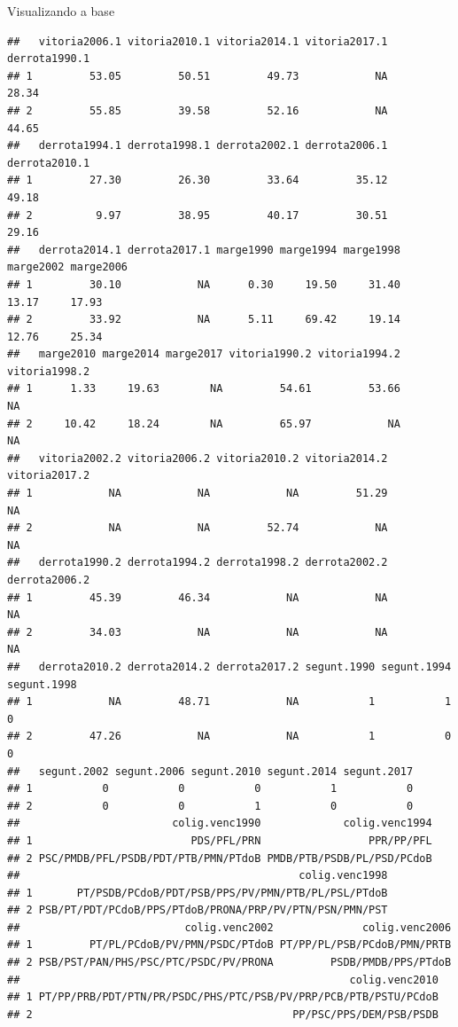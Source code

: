 \documentclass[
  10pt,
  ignorenonframetext,
]{beamer}
\begin{document}
\begin{frame}[fragile]{Visualizando a base}
\begin{verbatim}
##   vitoria2006.1 vitoria2010.1 vitoria2014.1 vitoria2017.1 derrota1990.1
## 1         53.05         50.51         49.73            NA         28.34
## 2         55.85         39.58         52.16            NA         44.65
##   derrota1994.1 derrota1998.1 derrota2002.1 derrota2006.1 derrota2010.1
## 1         27.30         26.30         33.64         35.12         49.18
## 2          9.97         38.95         40.17         30.51         29.16
##   derrota2014.1 derrota2017.1 marge1990 marge1994 marge1998 marge2002 marge2006
## 1         30.10            NA      0.30     19.50     31.40     13.17     17.93
## 2         33.92            NA      5.11     69.42     19.14     12.76     25.34
##   marge2010 marge2014 marge2017 vitoria1990.2 vitoria1994.2 vitoria1998.2
## 1      1.33     19.63        NA         54.61         53.66            NA
## 2     10.42     18.24        NA         65.97            NA            NA
##   vitoria2002.2 vitoria2006.2 vitoria2010.2 vitoria2014.2 vitoria2017.2
## 1            NA            NA            NA         51.29            NA
## 2            NA            NA         52.74            NA            NA
##   derrota1990.2 derrota1994.2 derrota1998.2 derrota2002.2 derrota2006.2
## 1         45.39         46.34            NA            NA            NA
## 2         34.03            NA            NA            NA            NA
##   derrota2010.2 derrota2014.2 derrota2017.2 segunt.1990 segunt.1994 segunt.1998
## 1            NA         48.71            NA           1           1           0
## 2         47.26            NA            NA           1           0           0
##   segunt.2002 segunt.2006 segunt.2010 segunt.2014 segunt.2017
## 1           0           0           0           1           0
## 2           0           0           1           0           0
##                        colig.venc1990             colig.venc1994
## 1                         PDS/PFL/PRN                 PPR/PP/PFL
## 2 PSC/PMDB/PFL/PSDB/PDT/PTB/PMN/PTdoB PMDB/PTB/PSDB/PL/PSD/PCdoB
##                                            colig.venc1998
## 1       PT/PSDB/PCdoB/PDT/PSB/PPS/PV/PMN/PTB/PL/PSL/PTdoB
## 2 PSB/PT/PDT/PCdoB/PPS/PTdoB/PRONA/PRP/PV/PTN/PSN/PMN/PST
##                          colig.venc2002              colig.venc2006
## 1         PT/PL/PCdoB/PV/PMN/PSDC/PTdoB PT/PP/PL/PSB/PCdoB/PMN/PRTB
## 2 PSB/PST/PAN/PHS/PSC/PTC/PSDC/PV/PRONA         PSDB/PMDB/PPS/PTdoB
##                                                    colig.venc2010
## 1 PT/PP/PRB/PDT/PTN/PR/PSDC/PHS/PTC/PSB/PV/PRP/PCB/PTB/PSTU/PCdoB
## 2                                         PP/PSC/PPS/DEM/PSB/PSDB

\end{verbatim}
\end{frame}
\end{document}

